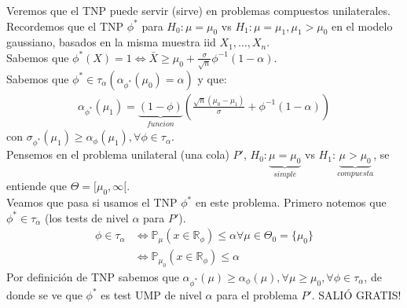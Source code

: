\documentclass[10pt]{article}
\theoremstyle{plain}
\theoremstyle{definition}
\begin{document}
Veremos que el TNP puede servir (sirve) en problemas compuestos unilaterales.\\
Recordemos que el TNP $\phi^*$ para $H_{0}: \mu = \mu_{0}$ vs $H_{1}: \mu = \mu_{1}, \mu_{1}>\mu_{0}$ en el modelo gaussiano, basados en la misma muestra iid $X_{1},\ldots,X_{n}$.\\
Sabemos que $\phi^*(X)=1 \Leftrightarrow \bar{X} \ge \mu_{0} + \frac{\sigma}{\sqrt{n}}\phi^{-1}(1-\alpha)$.\\
Sabemos que $\phi^* \in \tau_{\alpha} (\alpha_{\phi^*}(\mu_{0}) = \alpha)$ y que:
\begin{align*}
\alpha_{\phi^*}(\mu_{1}) = \underbrace{(1-\phi)}_{funcion} \left(\frac{\sqrt{n}(\mu_{0}-\mu_{1})}{\sigma}+ \phi^{-1}(1-\alpha)\right)
\end{align*}
con $\sigma_{\phi^*}(\mu_{1}) \ge \alpha_{\phi}(\mu_{1}), \forall \phi \in \tau_{\alpha}$.\\

Pensemos en el problema unilateral (una cola) $P'$, $H_{0}: \underbrace{\mu = \mu_{0}}_{simple}$ vs $H_{1}: \underbrace{\mu > \mu_{0}}_{compuesta}$, se entiende que $\Theta = [\mu_{0},\infty[$.\\
Veamos que pasa si usamos el TNP $\phi^*$ en este problema. Primero notemos que $\phi^* \in \tau_{\alpha}$ (los tests de nivel $\alpha$ para $P'$).\\
\begin{align*}
 \phi \in \tau_{\alpha} & \Leftrightarrow \mathbb{P}_{\mu}(x\in \mathbb{R}_{\phi}) \le \alpha \forall \mu \in \Theta_{0} = \{\mu_{0}\}\\
 & \Leftrightarrow \mathbb{P}_{\mu_{0}}(x\in \mathbb{R}_{\phi}) \le \alpha
\end{align*}
Por definición de TNP sabemos que $\alpha_{\phi^*}(\mu) \ge \alpha_{\phi}(\mu), \forall \mu \ge \mu_{0}, \forall \phi \in \tau_{\alpha}$, de donde se ve que $\phi^*$ es test UMP de nivel $\alpha$ para el problema $P'$. SALIÓ GRATIS!\\
\end{document}
